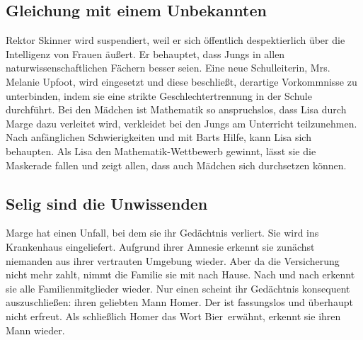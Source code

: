 \subsection{Gleichung mit einem Unbekannten}
Rektor Skinner wird suspendiert, weil er sich öffentlich despektierlich über die Intelligenz von Frauen äußert. Er behauptet, dass Jungs in allen naturwissenschaftlichen Fächern besser seien. Eine neue Schulleiterin, Mrs. Melanie Upfoot, wird eingesetzt und diese beschließt, derartige Vorkommnisse zu unterbinden, indem sie eine strikte Geschlechtertrennung in der Schule durchführt. Bei den Mädchen ist Mathematik so anspruchslos, dass Lisa durch Marge dazu verleitet wird, verkleidet bei den Jungs am Unterricht teilzunehmen. Nach anfänglichen Schwierigkeiten und mit Barts Hilfe, kann Lisa sich behaupten. Als Lisa den Mathematik-Wettbewerb gewinnt, lässt sie die Maskerade fallen und zeigt allen, dass auch Mädchen sich durchsetzen können.


\subsection{Selig sind die Unwissenden}
Marge hat einen Unfall, bei dem sie ihr Gedächtnis verliert. Sie wird ins Krankenhaus eingeliefert. Aufgrund ihrer Amnesie erkennt sie zunächst niemanden aus ihrer vertrauten Umgebung wieder. Aber da die Versicherung nicht mehr zahlt, nimmt die Familie sie mit nach Hause. Nach und nach erkennt sie alle Familienmitglieder wieder. Nur einen scheint ihr Gedächtnis konsequent auszuschließen: ihren geliebten Mann Homer. Der ist fassungslos und überhaupt nicht erfreut. Als schließlich Homer das Wort \glqq Bier\grqq\ erwähnt, erkennt sie ihren Mann wieder.


